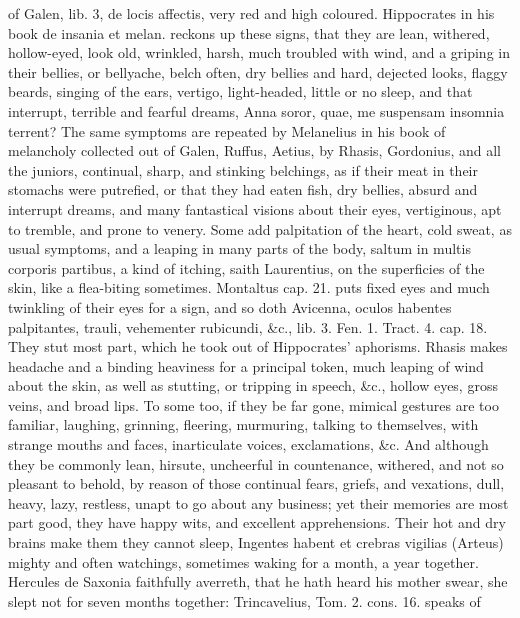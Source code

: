 {of Galen, lib. 3, de locis affectis, very red and high coloured.
Hippocrates in his book de insania et melan. reckons up these
signs, that they are  lean, withered, hollow-eyed, look old,
wrinkled, harsh, much troubled with wind, and a griping in their
bellies, or bellyache, belch often, dry bellies and hard, dejected
looks, flaggy beards, singing of the ears, vertigo, light-headed,
little or no sleep, and that interrupt, terrible and fearful dreams,
Anna soror, quae, me suspensam insomnia terrent? The same
symptoms are repeated by Melanelius in his book of melancholy collected
out of Galen, Ruffus, Aetius, by Rhasis, Gordonius, and all the
juniors, continual, sharp, and stinking belchings, as if their
meat in their stomachs were putrefied, or that they had eaten fish, dry
bellies, absurd and interrupt dreams, and many fantastical visions
about their eyes, vertiginous, apt to tremble, and prone to venery.
Some add palpitation of the heart, cold sweat, as usual symptoms,
and a leaping in many parts of the body, saltum in multis corporis
partibus, a kind of itching, saith Laurentius, on the superficies of
the skin, like a flea-biting sometimes. Montaltus cap. 21. puts
fixed eyes and much twinkling of their eyes for a sign, and so doth
Avicenna, oculos habentes palpitantes, trauli, vehementer rubicundi,
\&c., lib. 3. Fen. 1. Tract. 4. cap. 18. They stut most part, which he
took out of Hippocrates' aphorisms. Rhasis makes headache and a
binding heaviness for a principal token, much leaping of wind about the
skin, as well as stutting, or tripping in speech, \&c., hollow eyes,
gross veins, and broad lips. To some too, if they be far gone, mimical
gestures are too familiar, laughing, grinning, fleering, murmuring,
talking to themselves, with strange mouths and faces, inarticulate
voices, exclamations, \&c. And although they be commonly lean, hirsute,
uncheerful in countenance, withered, and not so pleasant to behold, by
reason of those continual fears, griefs, and vexations, dull, heavy,
lazy, restless, unapt to go about any business; yet their memories are
most part good, they have happy wits, and excellent apprehensions.
Their hot and dry brains make them they cannot sleep, Ingentes habent
et crebras vigilias (Arteus) mighty and often watchings, sometimes
waking for a month, a year together. Hercules de Saxonia
faithfully averreth, that he hath heard his mother swear, she slept not
for seven months together: Trincavelius, Tom. 2. cons. 16. speaks of
}
